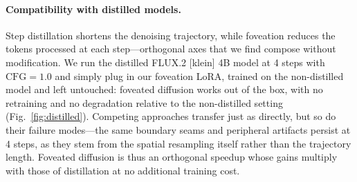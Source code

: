 
\paragraph{Compatibility with distilled models.}
Step distillation shortens the denoising trajectory, while foveation reduces the tokens processed at each step---orthogonal axes that we find compose without modification. We run the distilled FLUX.2 [klein] 4B model at 4 steps with $\text{CFG}=1.0$ and simply plug in our foveation LoRA, trained on the non-distilled model and left untouched: foveated diffusion works out of the box, with no retraining and no degradation relative to the non-distilled setting (Fig.~\ref{fig:distilled}). Competing approaches transfer just as directly, but so do their failure modes---the same boundary seams and peripheral artifacts persist at 4 steps, as they stem from the spatial resampling itself rather than the trajectory length. Foveated diffusion is thus an orthogonal speedup whose gains multiply with those of distillation at no additional training cost.
